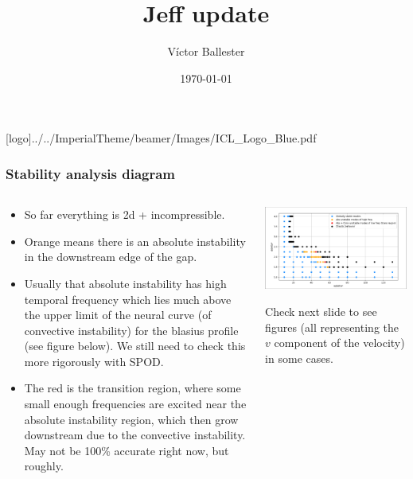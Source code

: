\documentclass[
  aspectratio=169, %
  t, %
  onlytextwidth, %
  10pt, %
]{beamer}
\title{Jeff update} %
\subtitle{} %
\author{Víctor Ballester} %
\date{\today} %
\def\imagefolder{../../ImperialTheme/beamer/Images}
\begin{document}
\begingroup
{} %
[logo]{\imagefolder/ICL_Logo_Blue.pdf} %
\frame[plain, s]{\titlepage} %
\endgroup

\begin{frame}
	\frametitle{Stability analysis diagram}
	\centering

	\begin{columns}[T] %
		\begin{column}{0.47\linewidth} %
			\begin{itemize}
				\item So far everything is 2d + incompressible.
				\item Orange means there is an absolute instability in the downstream edge of the gap.
				\item Usually that absolute instability has high temporal frequency which lies much above the upper limit of the neural curve (of convective instability) for the blasius profile (see figure below). We still need to check this more rigorously with SPOD.
				\item The red is the transition region, where some small enough frequencies are excited near the absolute instability region, which then grow downstream due to the convective instability. May not be 100\% accurate right now, but roughly.
			\end{itemize}
		\end{column}
		\begin{column}{0.52\linewidth} %
			\includegraphics[width=0.98\linewidth]{Images/stabilitycurve.png}

			Check next slide to see figures (all representing the $v$ component of the velocity) in some cases.
		\end{column}
	\end{columns}

\end{frame}
\end{document}
